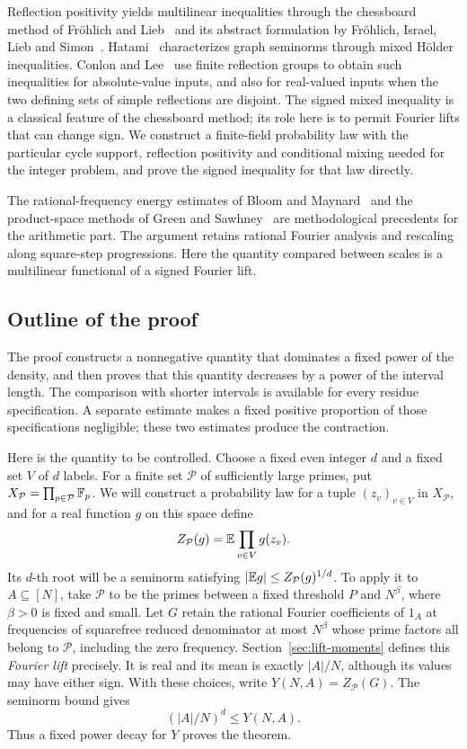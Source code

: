 Reflection positivity yields multilinear inequalities through the chessboard
method of Fr\"ohlich and Lieb~\cite[Theorem~2.2]{FrohlichLieb1978} and its
abstract formulation by Fr\"ohlich, Israel, Lieb and
Simon~\cite[Theorem~4.1]{FILS1978ReflectionI}.
Hatami~\cite[Theorem~2.8 of the arXiv version]{Hatami2010} characterizes
graph seminorms through mixed H\"older inequalities. Conlon and
Lee~\cite[Theorems~1.2 and~1.3]{ConlonLee2017Reflection} use finite
reflection groups to obtain such inequalities for absolute-value inputs,
and also for real-valued inputs when the two defining sets of simple
reflections are disjoint.
The signed mixed inequality is a classical feature of the chessboard
method; its role here is to permit Fourier lifts that can change sign.
We construct a finite-field probability law with the particular cycle
support, reflection positivity and conditional mixing needed for the
integer problem, and prove the signed inequality for that law directly.

The rational-frequency energy estimates of Bloom and
Maynard~\cite{BloomMaynard2022} and the product-space methods of Green and
Sawhney~\cite{GreenSawhney2025} are methodological precedents for the
arithmetic part. The argument retains rational Fourier analysis and
rescaling along square-step progressions. Here the quantity compared
between scales is a multilinear functional of a signed Fourier lift.

\subsection{Outline of the proof}

The proof constructs a nonnegative quantity that dominates a fixed power
of the density, and then proves that this quantity decreases by a power
of the interval length. The comparison with shorter intervals is available
for every residue specification. A separate estimate makes a fixed positive
proportion of those specifications negligible; these two estimates produce
the contraction.

Here is the quantity to be controlled. Choose a fixed even integer $d$
and a fixed set $V$ of $d$ labels. For a finite set $\mathcal P$ of sufficiently
large primes, put $X_{\mathcal P}=\prod_{p\in\mathcal P}\mathbb F_p$.
We will construct a probability law for a tuple $(z_v)_{v\in V}$ in
$X_{\mathcal P}$, and for a real function $g$ on this space define
\[
 Z_{\mathcal P}(g)=\mathbb E\prod_{v\in V}g(z_v).
\]
Its $d$-th root will be a seminorm satisfying
$|\mathbb E g|\le Z_{\mathcal P}(g)^{1/d}$. To apply it to $A\subseteq[N]$,
take $\mathcal P$ to be the primes between a fixed threshold $P$ and
$N^\beta$, where $\beta>0$ is fixed and small. Let $G$ retain the
rational Fourier coefficients of $1_A$ at frequencies of squarefree
reduced denominator at most $N^\beta$ whose prime factors all belong
to $\mathcal P$, including the zero frequency.
Section~\ref{sec:lift-moments} defines this \emph{Fourier lift} precisely.
It is real and its mean is exactly $|A|/N$, although its values may have
either sign. With these choices, write $Y(N,A)=Z_{\mathcal P}(G)$.
The seminorm bound gives
\[
 (|A|/N)^d\le Y(N,A).
\]
Thus a fixed power decay for $Y$ proves the theorem.

